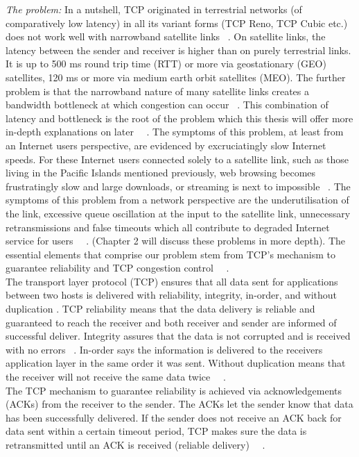 \emph{The problem:} In a nutshell, TCP originated in terrestrial networks (of comparatively low latency) in all its variant forms (TCP Reno, TCP Cubic etc.) does not work well with narrowband satellite links ~\cite{5}. On satellite links, the latency between the sender and receiver is higher than on purely terrestrial links. It is up to 500 ms round trip time (RTT) or more via geostationary (GEO) satellites, 120 ms or more via medium earth orbit satellites (MEO). The further problem is that the narrowband nature of many satellite links creates a bandwidth bottleneck at which congestion can occur ~\cite{4}. This combination of latency and bottleneck is the root of the problem which this thesis will offer more in-depth explanations on later ~\cite{7}~\cite{8}. The symptoms of this problem, at least from an Internet users perspective, are evidenced by excruciatingly slow Internet speeds. For these Internet users connected solely to a satellite link, such as those living in the Pacific Islands mentioned previously, web browsing becomes frustratingly slow and large downloads, or streaming is next to impossible ~\cite{4}. The symptoms of this problem from a network perspective are the underutilisation of the link, excessive queue oscillation at the input to the satellite link, unnecessary retransmissions and false timeouts which all contribute to degraded Internet service for users ~\cite{8}~\cite{9}. (Chapter 2 will discuss these problems in more depth). The essential elements that comprise our problem stem from TCP's mechanism to guarantee reliability and TCP congestion control ~\cite{10}~\cite{11}. \\

The transport layer protocol (TCP) ensures that all data sent for applications between two hosts is delivered with reliability, integrity, in-order, and without duplication . TCP reliability means that the data delivery is reliable and guaranteed to reach the receiver and both receiver and sender are informed of successful deliver. Integrity assures that the data is not corrupted and is received with no errors ~\cite{1}. In-order says the information is delivered to the receivers application layer in the same order it was sent. Without duplication means that the receiver will not receive the same data twice ~\cite{1}~\cite{2}.\\

The TCP mechanism to guarantee reliability is achieved via acknowledgements (ACKs) from the receiver to the sender. The ACKs let the sender know that data has been successfully delivered. If the sender does not receive an ACK back for data sent within a certain timeout period, TCP makes sure the data is retransmitted until an ACK is received (reliable delivery) ~\cite{1}~\cite{12}. \\

